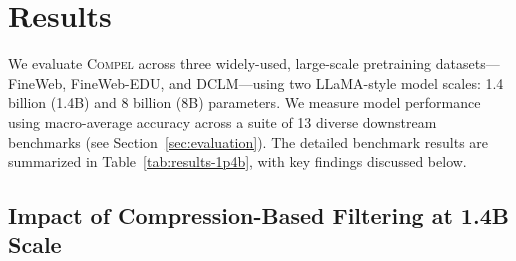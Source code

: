 \section{Results}\label{sec:results}

We evaluate \textsc{Compel} across three widely-used, large-scale pretraining datasets---FineWeb, FineWeb-EDU, and DCLM---using two LLaMA-style model scales: 1.4 billion (1.4B) and 8 billion (8B) parameters.
We measure model performance using macro-average accuracy across a suite of 13 diverse downstream benchmarks (see Section~\ref{sec:evaluation}).
The detailed benchmark results are summarized in Table~\ref{tab:results-1p4b}, with key findings discussed below.

\subsection{Impact of Compression-Based Filtering at 1.4B Scale}\label{sec:results-1p4b}

